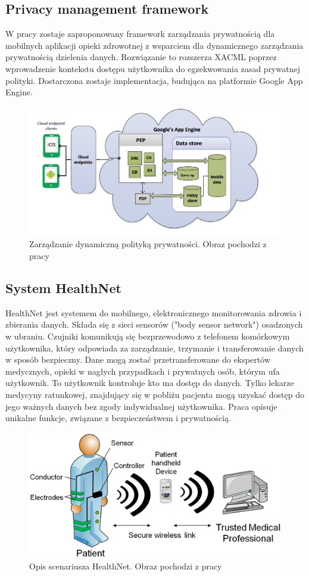 \subsection{Privacy management framework \cite{Ammar2014}}
W pracy zostaje zaproponowany framework zarządzania prywatnością dla mobilnych aplikacji opieki zdrowotnej z wsparciem dla dynamicznego zarządzania prywatnością dzielenia danych. Rozwiązanie to rozszerza XACML poprzez wprowadzenie kontekstu dostępu użytkownika do egzekwowania zasad prywatnej polityki. Dostarczona zostaje implementacja, budująca na platformie Google App Engine.

\begin{figure}[h!]
	\centering
		\includegraphics[scale=0.6]{MobiDyc_Private_Mobile-Based_Health_Data_Sharing_Through_fig1}
	\caption{Zarządzanie dynamiczną polityką prywatności. Obraz pochodzi z pracy \cite{Ammar2014}}
\end{figure}


\subsection{System HealthNet \cite{5534981}}
HealthNet jest systemem do mobilnego, elektronicznego monitorowania zdrowia i zbierania danych. Składa się z sieci sensorów ("body sensor network") osadzonych w ubraniu. Czujniki komunikują się bezprzewodowo z telefonem komórkowym użytkownika, który odpowiada za zarządzanie, trzymanie i transferowanie danych w sposób bezpieczny. Dane mogą zostać przetransferowane do ekspertów medycznych, opieki w nagłych przypadkach i prywatnych osób, którym ufa użytkownik. To użytkownik kontroluje kto ma dostęp do danych. Tylko lekarze medycyny ratunkowej, znajdujący się w pobliżu pacjenta mogą uzyskać dostęp do jego ważnych danych bez zgody indywidualnej użytkownika. Praca opisuje unikalne funkcje, związane z bezpieczeństwem i prywatnością. 

\begin{figure}[h!]
	\centering
		\includegraphics[scale=0.3]{Security_and_Privacy_for_Mobile_Electronic_Health_Monitoring_and_Recording_Systems_fig1}
	\caption{Opis scenariusza HealthNet. Obraz pochodzi z pracy \cite{5534981}}
\end{figure}
